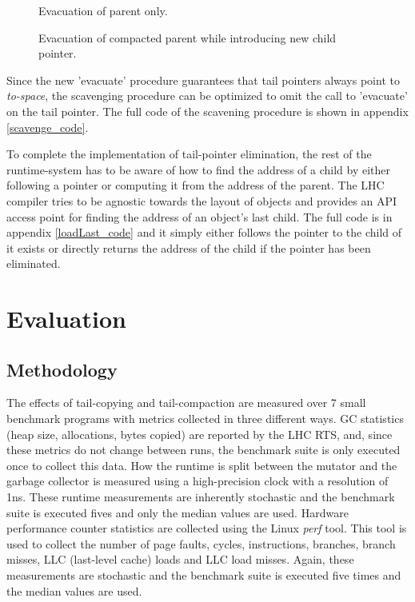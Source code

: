\documentclass[a4paper,oneside]{memoir}
\begin{document}
\begin{figure}[b]
  
  \caption{Evacuation of parent only.}
  \label{multiple_parents}
\end{figure}


\begin{figure}
  
  \caption{Evacuation of compacted parent while introducing new child pointer.}
  \label{parent_no_child}
\end{figure}

Since the new 'evacuate' procedure guarantees that tail pointers always point
to \emph{to-space}, the scavenging procedure can be optimized to omit the
call to 'evacuate' on the tail pointer. The full code of the scavening procedure
is shown in appendix \ref{scavenge_code}.

To complete the implementation of tail-pointer elimination, the rest of the
runtime-system has to be aware of how to find the address of a child by either
following a pointer or computing it from the address of the parent. The LHC
compiler tries to be agnostic towards the layout of objects and provides
an API access point for finding the address of an object's last child. The full
code is in appendix \ref{loadLast_code} and it simply either follows the pointer
to the child of it exists or directly returns the address of the child if the
pointer has been eliminated.



\chapter{Evaluation}

\section{Methodology}
The effects of tail-copying and tail-compaction are measured over 7 small
benchmark programs with metrics collected in three different ways.
GC statistics (heap size, allocations, bytes copied) are reported by the LHC RTS,
and, since these metrics do not change between runs, the benchmark suite is only
executed once to collect this data.
How the runtime is split between the mutator and the garbage collector is
measured using a high-precision clock with a resolution of 1ns. These runtime
measurements are inherently stochastic and the benchmark suite is executed
fives and only the median values are used.
Hardware performance counter statistics are collected using the Linux \emph{perf}
tool.\cite{perf} This tool is used to collect the number of page faults, cycles, instructions,
branches, branch misses, LLC (last-level cache) loads and LLC load misses. Again,
these measurements are stochastic and the benchmark suite is executed five times
and the median values are used.
\end{document}
